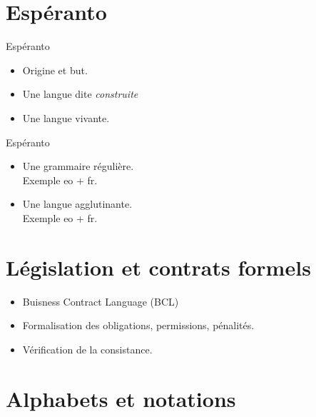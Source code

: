 \documentclass{beamer}
\begin{document}
\section{Espéranto}

\begin{frame}
\begin{center}
\huge Espéranto
\end{center}
\begin{itemize}
\item Origine et but.
\item Une langue dite \emph{construite}
\item Une langue vivante.
\end{itemize}
\end{frame}

\begin{frame}
\begin{center}
\huge Espéranto
\end{center}
\begin{itemize}
\item Une grammaire régulière.
\\ Exemple eo + fr.
\item Une langue agglutinante.
\\ Exemple eo + fr.
\end{itemize}
\end{frame}

\section[Contrats]{Législation et contrats formels}

\begin{frame}  
  \begin{itemize}
  \item Buisness Contract Language (BCL)%
  \item Formalisation des obligations, permissions, pénalités.%
  \item Vérification de la consistance.
  \end{itemize}
\end{frame}

\section[Alphabets]{Alphabets et notations}
\end{document}
